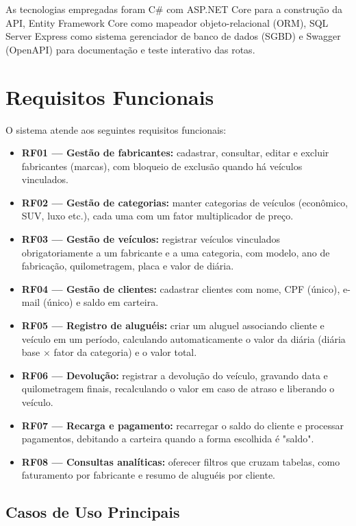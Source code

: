 \documentclass[12pt]{article}
\begin{document}
As tecnologias empregadas foram C\# com ASP.NET Core para a construção da API, Entity Framework Core como mapeador objeto-relacional (ORM), SQL Server Express como sistema gerenciador de banco de dados (SGBD) e Swagger (OpenAPI) para documentação e teste interativo das rotas.

\section{Requisitos Funcionais}

O sistema atende aos seguintes requisitos funcionais:

\begin{itemize}
  \item \textbf{RF01 --- Gestão de fabricantes:} cadastrar, consultar, editar e excluir fabricantes (marcas), com bloqueio de exclusão quando há veículos vinculados.
  \item \textbf{RF02 --- Gestão de categorias:} manter categorias de veículos (econômico, SUV, luxo etc.), cada uma com um fator multiplicador de preço.
  \item \textbf{RF03 --- Gestão de veículos:} registrar veículos vinculados obrigatoriamente a um fabricante e a uma categoria, com modelo, ano de fabricação, quilometragem, placa e valor de diária.
  \item \textbf{RF04 --- Gestão de clientes:} cadastrar clientes com nome, CPF (único), e-mail (único) e saldo em carteira.
  \item \textbf{RF05 --- Registro de aluguéis:} criar um aluguel associando cliente e veículo em um período, calculando automaticamente o valor da diária (diária base $\times$ fator da categoria) e o valor total.
  \item \textbf{RF06 --- Devolução:} registrar a devolução do veículo, gravando data e quilometragem finais, recalculando o valor em caso de atraso e liberando o veículo.
  \item \textbf{RF07 --- Recarga e pagamento:} recarregar o saldo do cliente e processar pagamentos, debitando a carteira quando a forma escolhida é "saldo".
  \item \textbf{RF08 --- Consultas analíticas:} oferecer filtros que cruzam tabelas, como faturamento por fabricante e resumo de aluguéis por cliente.
\end{itemize}

\subsection{Casos de Uso Principais}
\end{document}
